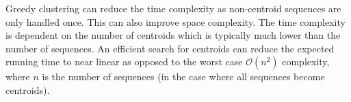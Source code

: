Greedy clustering can reduce the time complexity as non-centroid sequences are
only handled once. This can also improve space complexity. The time complexity
is dependent on the number of centroids which is typically much lower than the
number of sequences. An efficient search for centroids can reduce the expected
running time to near linear as opposed to the worst case
$\mathcal{O}\left(n^2\right)$ complexity, where $n$ is the number of sequences
(in the case where all sequences become centroids).
